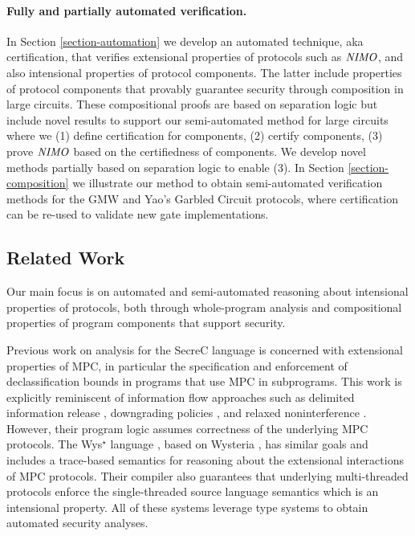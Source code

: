 \paragraph{Fully and partially automated verification.} In Section
\ref{section-automation} we develop an automated technique, aka
certification, that verifies extensional properties of protocols such
as $\mathit{NIMO}$, and also intensional properties of protocol
components. The latter include properties of protocol components that
provably guarantee security through composition in large
circuits. These compositional proofs are based on separation logic but
include novel results to support our semi-automated method for large
circuits where we (1) define certification for components, (2) certify
components, (3) prove $\mathit{NIMO}$ based on the certifiedness of
components. We develop novel methods partially based on separation
logic \cite{barthe2019probabilistic} to enable (3).  In Section
\ref{section-composition} we illustrate our method to obtain
semi-automated verification methods for the GMW and Yao's Garbled
Circuit protocols, where certification can be re-used to validate new
gate implementations.

\subsection{Related Work}
\label{section-related-work}

Our main focus is on automated and semi-automated reasoning about
intensional properties of protocols, both through whole-program
analysis and compositional properties of program components that
support security.

Previous work on analysis for the SecreC language
\cite{almeida2018enforcing,10.1145/2637113.2637119} is concerned with
extensional properties of MPC, in particular the specification and
enforcement of declassification bounds in programs that use MPC in
subprograms. This work is explicitly reminiscent of information flow
approaches such as delimited information release
\cite{10.1007/978-3-540-37621-7_9}, downgrading policies \cite{li2005downgrading}, and
relaxed noninterference \cite{10.1145/1040305.1040319}. However, their
program logic assumes correctness of the underlying MPC protocols.
The Wys$^\star$ language \cite{wysstar}, based on Wysteria
\cite{rastogi2014wysteria}, has similar goals and includes a
trace-based semantics for reasoning about the extensional interactions
of MPC protocols. Their compiler also guarantees that underlying
multi-threaded protocols enforce the single-threaded source language
semantics which is an intensional property.  All of these systems
leverage type systems to obtain automated security analyses.

